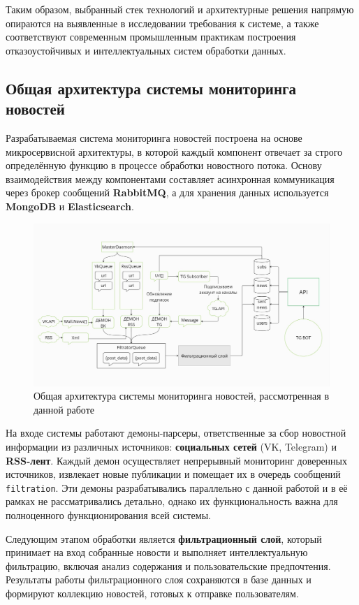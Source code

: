 Таким образом, выбранный стек технологий и архитектурные решения напрямую опираются на выявленные в исследовании требования к системе, а также соответствуют современным промышленным практикам построения отказоустойчивых и интеллектуальных систем обработки данных.

\subsection{Общая архитектура системы мониторинга новостей}
Разрабатываемая система мониторинга новостей построена на основе микросервисной архитектуры, в которой каждый компонент отвечает за строго определённую функцию в процессе обработки новостного потока.
Основу взаимодействия между компонентами составляет асинхронная коммуникация через брокер сообщений \textbf{RabbitMQ}, а для хранения данных используется \textbf{MongoDB} и \textbf{Elasticsearch}.

\begin{figure}[H]
    \centering
    \includegraphics[width=150mm]{images/all_process}
    \caption{Общая архитектура системы мониторинга новостей, рассмотренная в данной работе}
    \label{fig:all_process}
\end{figure}

На входе системы работают демоны-парсеры, ответственные за сбор новостной информации из различных источников: \textbf{социальных сетей} (VK, Telegram) и \textbf{RSS-лент}.
Каждый демон осуществляет непрерывный мониторинг доверенных источников, извлекает новые публикации и помещает их в очередь сообщений \texttt{filtration}.
Эти демоны разрабатывались параллельно с данной работой и в её рамках не рассматривались детально, однако их функциональность важна для полноценного функционирования всей системы.

Следующим этапом обработки является \textbf{фильтрационный слой}, который принимает на вход собранные новости и выполняет интеллектуальную фильтрацию, включая анализ содержания и пользовательские предпочтения.
Результаты работы фильтрационного слоя сохраняются в базе данных и формируют коллекцию новостей, готовых к отправке пользователям.

